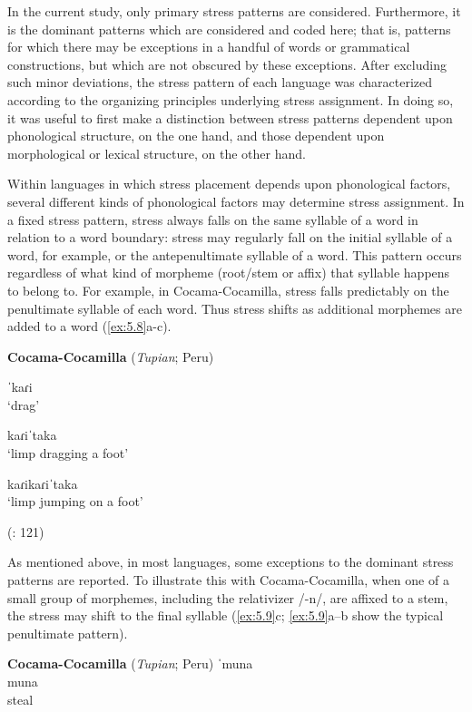  In the current study, only primary stress patterns are considered. Furthermore, it is the dominant patterns which are considered and coded here; that is, patterns for which there may be exceptions in a handful of words or grammatical constructions, but which are not obscured by these exceptions. After excluding such minor deviations, the stress pattern of each language was characterized according to the organizing principles underlying stress assignment. In doing so, it was useful to first make a distinction between stress patterns dependent upon phonological structure, on the one hand, and those dependent upon morphological or lexical structure, on the other hand.

   Within languages in which stress placement depends upon phonological factors, several different kinds of phonological factors may determine stress assignment. In a fixed stress pattern, stress always falls on the same syllable of a word in relation to a word boundary: stress may regularly fall on the initial syllable of a word, for example, or the antepenultimate syllable of a word. This pattern occurs regardless of what kind of morpheme (root/stem or affix) that syllable happens to belong to. For example, in Cocama-Cocamilla, stress falls predictably on the penultimate syllable of each word. Thus stress shifts as additional morphemes are added to a word (\ref{ex:5.8}a-c).

\ea\label{ex:5.8}
  \textbf{Cocama-Cocamilla} (\textit{Tupian}; Peru)

\ea   ˈkaɾi\\
\glt ‘drag’

\ex   kaɾiˈtaka\\
\glt ‘limp dragging a foot’

\ex   kaɾikaɾiˈtaka\\
\glt ‘limp jumping on a foot’

(\citealt{VallejosYopán2010}: 121)
\z
\z

  As mentioned above, in most languages, some exceptions to the dominant stress patterns are reported. To illustrate this with Cocama-Cocamilla, when one of a small group of morphemes, including the relativizer /-n/, are affixed to a stem, the stress may shift to the final syllable (\ref{ex:5.9}c; \ref{ex:5.9}a--b show the typical penultimate pattern).

\ea\label{ex:5.9}
  \textbf{Cocama-Cocamilla} (\textit{Tupian}; Peru)
\ea   ˈmuna\\
  muna\\
steal


